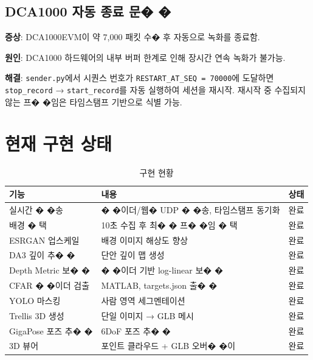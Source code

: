 \documentclass[a4paper,12pt]{article}
\begin{document}
\subsection{DCA1000 자동 종료 문� �}

\textbf{증상}: DCA1000EVM이 약 7,000 패킷 수�  후 자동으로 녹화를 종료함.

\textbf{원인}: DCA1000 하드웨어의 내부 버퍼 한계로 인해 장시간 연속 녹화가 불가능.

\textbf{해결}: \texttt{sender.py}에서 시퀀스 번호가 \texttt{RESTART\_AT\_SEQ = 70000}에 도달하면
\texttt{stop\_record} → \texttt{start\_record}를 자동 실행하여 세션을 재시작.
재시작 중 수집되지 않는 프� �임은 타임스탬프 기반으로 식별 가능.

\section{현재 구현 상태}

\begin{table}[h]
\centering
\begin{tabularx}{\textwidth}{lXl}
  \toprule
  \textbf{기능} & \textbf{내용} & \textbf{상태} \\
  \midrule
  실시간 � �송 & � �이더/웹�  UDP � �송, 타임스탬프 동기화 & \textcolor{green!60!black}{완료} \\
  배경 � 택 & 10초 수집 후 최� � 프� �임 � 택 & \textcolor{green!60!black}{완료} \\
  ESRGAN 업스케일 & 배경 이미지 해상도 향상 & \textcolor{green!60!black}{완료} \\
  DA3 깊이 추� � & 단안 깊이 맵 생성 & \textcolor{green!60!black}{완료} \\
  Depth Metric 보� � & � �이더 기반 log-linear 보� � & \textcolor{green!60!black}{완료} \\
  CFAR � �이더 검출 & MATLAB, targets.json 출� � & \textcolor{green!60!black}{완료} \\
  YOLO 마스킹 & 사람 영역 세그멘테이션 & \textcolor{green!60!black}{완료} \\
  Trellis 3D 생성 & 단일 이미지 → GLB 메시 & \textcolor{green!60!black}{완료} \\
  GigaPose 포즈 추� � & 6DoF 포즈 추� � & \textcolor{green!60!black}{완료} \\
  3D 뷰어 & 포인트 클라우드 + GLB 오버� �이 & \textcolor{green!60!black}{완료} \\
  \bottomrule
\end{tabularx}
\caption{구현 현황}
\end{table}
\end{document}
